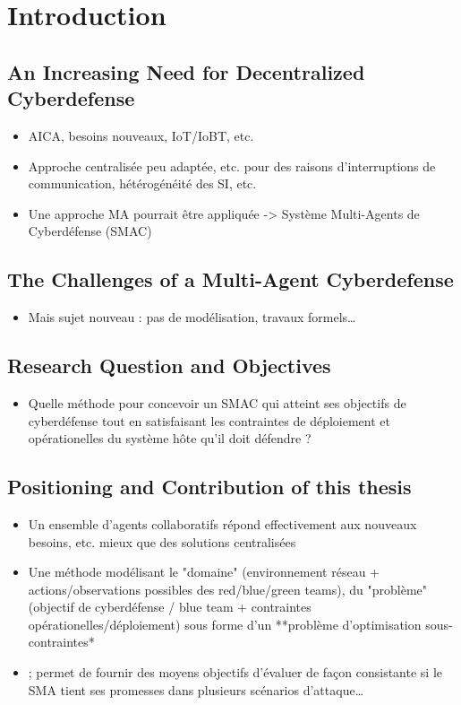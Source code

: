 \chapter{Introduction}\label{ch:introduction}

\section{An Increasing Need for Decentralized Cyberdefense}
\begin{itemize}
    \item AICA, besoins nouveaux, IoT/IoBT, etc.
    \item Approche centralisée peu adaptée, etc. pour des raisons d’interruptions de communication, hétérogénéité des SI, etc.
    \item Une approche MA pourrait être appliquée -> Système Multi-Agents de Cyberdéfense (SMAC)
\end{itemize}

\section{The Challenges of a Multi-Agent Cyberdefense}
\begin{itemize}
    \item Mais sujet nouveau : pas de modélisation, travaux formels…
\end{itemize}

\section{Research Question and Objectives}
\begin{itemize}
    \item Quelle méthode pour concevoir un SMAC qui atteint ses objectifs de cyberdéfense tout en satisfaisant les contraintes de déploiement et opérationelles du système hôte qu'il doit défendre ?
\end{itemize}

\section{Positioning and Contribution of this thesis}
\begin{itemize}
    \item Un ensemble d’agents collaboratifs répond effectivement aux nouveaux besoins, etc. mieux que des solutions centralisées
    \item Une méthode modélisant le "domaine" (environnement réseau + actions/observations possibles des red/blue/green teams), du "problème" (objectif de cyberdéfense / blue team + contraintes opérationelles/déploiement) sous forme d'un **problème d'optimisation sous-contraintes*\item ; permet de fournir des moyens objectifs d’évaluer de façon consistante si le SMA tient ses promesses dans plusieurs scénarios d’attaque…
\end{itemize}

